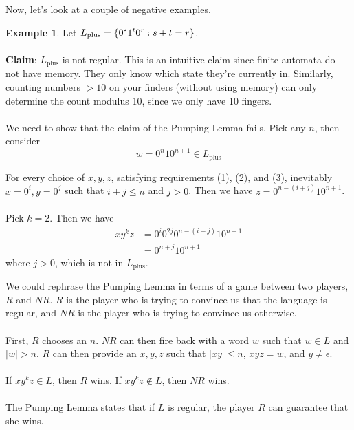 \documentclass[]{article}
\DeclarePairedDelimiter{\set}{\lbrace}{\rbrace}
\theoremstyle{definition}
\newtheorem{ex}{Example}[section]
\begin{document}
        Now, let's look at a couple of negative examples.
        \begin{ex}
          Let $L_\text{plus} = \set{0^s 1^t 0^r : s + t = r}$.
          \\ \\
          \textbf{Claim}: $L_\text{plus}$ is not regular. This is an intuitive claim since finite automata do not have memory. They only know which state they're currently in. Similarly, counting numbers $> 10$ on your finders (without using memory) can only determine the count modulus 10, since we only have 10 fingers.
          \\ \\
          We need to show that the claim of the Pumping Lemma fails. Pick any $n$, then consider
          $$
            w = 0^n 1 0^{n + 1} \in L_\text{plus}
          $$

          For every choice of $x, y, z$, satisfying requirements (1), (2), and (3), inevitably $x = 0^i, y = 0^j$ such that $i+j \le n$ and $j > 0$. Then we have $z = 0^{n - (i + j)} 1 0^{n + 1}$.
          \\ \\
          Pick $k = 2$. Then we have
          \begin{align*}
            xy^kz &= 0^i 0^{2j} 0^{n - (i + j)} 1 0^{n + 1} \\
            &= 0^{n + j} 1 0^{n + 1}
          \end{align*}
          where $j > 0$, which is not in $L_\text{plus}$.
        \end{ex}

        We could rephrase the Pumping Lemma in terms of a game between two players, $R$ and $NR$. $R$ is the player who is trying to convince us that the language is regular, and $NR$ is the player who is trying to convince us otherwise.
        \\ \\
        First, $R$ chooses an $n$. $NR$ can then fire back with a word $w$ such that $w \in L$ and $|w| > n$. $R$ can then provide an $x, y, z$ such that $|xy| \le n$, $xyz = w$, and $y \ne \epsilon$.
        \\ \\
        If $xy^kz \in L$, then $R$ wins. If $xy^kz \not \in L$, then $NR$ wins.
        \\ \\
        The Pumping Lemma states that if $L$ is regular, the player $R$ can guarantee that she wins.
\end{document}
